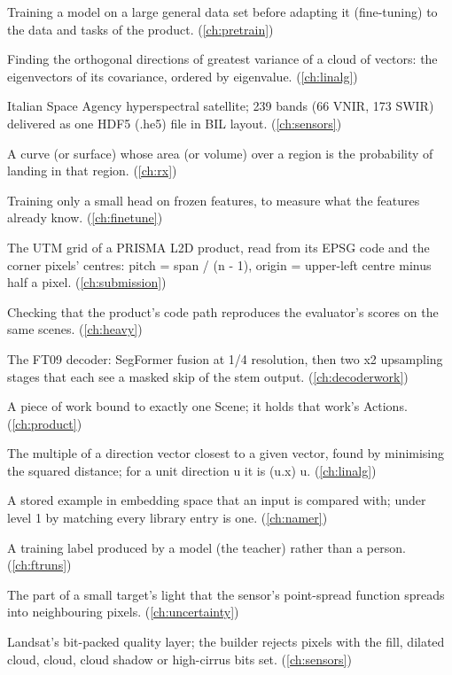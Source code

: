 \begin{description}[style=nextline,leftmargin=1.2em,font=\normalfont\bfseries]
\item[Pretraining] Training a model on a large general data set before adapting it (fine-tuning) to the data and tasks of the product. (\cref{ch:pretrain})
\item[Principal component analysis] Finding the orthogonal directions of greatest variance of a cloud of vectors: the eigenvectors of its covariance, ordered by eigenvalue. (\cref{ch:linalg})
\item[PRISMA] Italian Space Agency hyperspectral satellite; 239 bands (66 VNIR, 173 SWIR) delivered as one HDF5 (.he5) file in BIL layout. (\cref{ch:sensors})
\item[Probability density] A curve (or surface) whose area (or volume) over a region is the probability of landing in that region. (\cref{ch:rx})
\item[Probe] Training only a small head on frozen features, to measure what the features already know. (\cref{ch:finetune})
\item[Product grid (PRISMA)] The UTM grid of a PRISMA L2D product, read from its EPSG code and the corner pixels' centres: pitch = span / (n - 1), origin = upper-left centre minus half a pixel. (\cref{ch:submission})
\item[Product parity] Checking that the product's code path reproduces the evaluator's scores on the same scenes. (\cref{ch:heavy})
\item[Progressive decoder] The FT09 decoder: SegFormer fusion at 1/4 resolution, then two x2 upsampling stages that each see a masked skip of the stem output. (\cref{ch:decoderwork})
\item[Project] A piece of work bound to exactly one Scene; it holds that work's Actions. (\cref{ch:product})
\item[Projection] The multiple of a direction vector closest to a given vector, found by minimising the squared distance; for a unit direction u it is (u.x) u. (\cref{ch:linalg})
\item[Prototype] A stored example in embedding space that an input is compared with; under level 1 by matching every library entry is one. (\cref{ch:namer})
\item[Pseudo-label] A training label produced by a model (the teacher) rather than a person. (\cref{ch:ftruns})
\item[PSF halo] The part of a small target's light that the sensor's point-spread function spreads into neighbouring pixels. (\cref{ch:uncertainty})
\item[QA PIXEL] Landsat's bit-packed quality layer; the builder rejects pixels with the fill, dilated cloud, cloud, cloud shadow or high-cirrus bits set. (\cref{ch:sensors})

\end{description}

